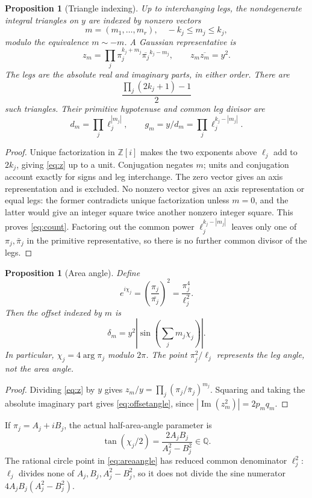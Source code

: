 \documentclass[11pt]{article}
\newtheorem{proposition}[theorem]{Proposition}
\theoremstyle{definition}\newtheorem{definition}[theorem]{Definition}
\theoremstyle{remark}\newtheorem{remark}[theorem]{Remark}
\newcommand{\Q}{\mathbb Q}\newcommand{\Z}{\mathbb Z}\newcommand{\R}{\mathbb R}
\newcommand{\im}{\operatorname{Im}}\newcommand{\Jac}{\operatorname{Jac}}
\begin{document}
\begin{proposition}[Triangle indexing]\label{prop:index}
Up to interchanging legs, the nondegenerate integral triangles on $y$ are indexed by nonzero vectors
\[
m=(m_1,\ldots,m_r),\quad -k_j\le m_j\le k_j,
\]
modulo the equivalence $m\sim-m$. A Gaussian representative is
\begin{equation}\label{eq:z}
z_m=\prod_j\pi_j^{k_j+m_j}\overline{\pi_j}^{k_j-m_j},
\qquad z_m\overline{z_m}=y^2.
\end{equation}
The legs are the absolute real and imaginary parts, in either order. There are
\begin{equation}\label{eq:count}
\frac{\prod_j(2k_j+1)-1}{2}
\end{equation}
such triangles. Their primitive hypotenuse and common leg divisor are
\[
d_m=\prod_j\ell_j^{|m_j|},\qquad
 g_m=y/d_m=\prod_j\ell_j^{k_j-|m_j|}.
\]
\end{proposition}
\begin{proof}
Unique factorization in $\Z[i]$ makes the two exponents above $\ell_j$ add to $2k_j$, giving \eqref{eq:z} up to a unit. Conjugation negates $m$; units and conjugation account exactly for signs and leg interchange. The zero vector gives an axis representation and is excluded. No nonzero vector gives an axis representation or equal legs: the former contradicts unique factorization unless $m=0$, and the latter would give an integer square twice another nonzero integer square. This proves \eqref{eq:count}. Factoring out the common power $\ell_j^{k_j-|m_j|}$ leaves only one of $\pi_j,\bar\pi_j$ in the primitive representative, so there is no further common divisor of the legs.
\end{proof}

\begin{proposition}[Area angle]\label{prop:angle}
Define
\begin{equation}\label{eq:areaangle}
e^{i\chi_j}=\left(\frac{\pi_j}{\overline{\pi_j}}\right)^2
=\frac{\pi_j^4}{\ell_j^2}.
\end{equation}
Then the offset indexed by $m$ is
\begin{equation}\label{eq:offsetangle}
\delta_m=y^2\left|\sin\left(\sum_jm_j\chi_j\right)\right|.
\end{equation}
In particular, $\chi_j=4\arg\pi_j$ modulo $2\pi$. The point $\pi_j^2/\ell_j$ represents the leg angle, not the area angle.
\end{proposition}
\begin{proof}
Dividing \eqref{eq:z} by $y$ gives $z_m/y=\prod_j(\pi_j/\bar\pi_j)^{m_j}$. Squaring and taking the absolute imaginary part gives \eqref{eq:offsetangle}, since $|\im(z_m^2)|=2p_mq_m$.
\end{proof}
If $\pi_j=A_j+iB_j$, the actual half-area-angle parameter is
\[
\tan(\chi_j/2)=\frac{2A_jB_j}{A_j^2-B_j^2}\in\Q.
\]
The rational circle point in \eqref{eq:areaangle} has reduced common denominator $\ell_j^2$: $\ell_j$ divides none of $A_j,B_j,A_j^2-B_j^2$, so it does not divide the sine numerator $4A_jB_j(A_j^2-B_j^2)$.
\end{document}
